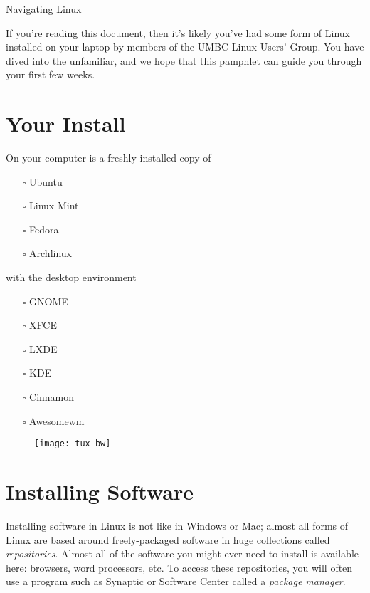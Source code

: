 \documentclass[11pt,notumble]{leaflet}
\begin{document}
\begin{center} \LARGE
    Navigating Linux
\end{center}

If you're reading this document, then it's likely you've had some form of Linux
installed on your laptop by members of the UMBC Linux Users' Group. You have
dived into the unfamiliar, and we hope that this pamphlet can guide you through
your first few weeks.

\section{Your Install}
\label{section:your-install}

On your computer is a freshly installed copy of
\begin{multicols}{2}
\begin{itemize}
    \item[$\square$] Ubuntu
    \item[$\square$] Linux Mint
    \item[$\square$] Fedora
    \item[$\square$] Archlinux
\end{itemize}
\end{multicols}
with the desktop environment
\begin{multicols}{2}
\begin{itemize}
    \item[$\square$] GNOME
    \item[$\square$] XFCE
    \item[$\square$] LXDE
    \item[$\square$] KDE
    \item[$\square$] Cinnamon
    \item[$\square$] Awesomewm
\end{itemize}
\end{multicols}

\vfill

\begin{figure}[hb]
    \centering
    \texttt{[image: tux-bw]}
\end{figure}

\pagebreak

\section{Installing Software}
\label{section:installing-software}

Installing software in Linux is not like in Windows or Mac; almost all forms of
Linux are based around freely-packaged software in huge collections called
\emph{repositories}. Almost all of the software you might ever need to install
is available here: browsers, word processors, etc. To access these repositories,
you will often use a program such as Synaptic or Software Center called a
\emph{package manager}.
\end{document}
